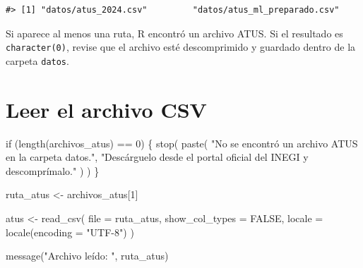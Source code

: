 \documentclass[
  spanish,
  10.5pt,
  letterpaper,
  openany,
  headings=big]{scrbook}
\newenvironment{Shaded}{}{}
\newcommand{\AttributeTok}[1]{\textcolor[rgb]{0.84,0.23,0.29}{#1}}
\newcommand{\ConstantTok}[1]{\textcolor[rgb]{0.00,0.36,0.77}{#1}}
\newcommand{\ControlFlowTok}[1]{\textcolor[rgb]{0.84,0.23,0.29}{#1}}
\newcommand{\DecValTok}[1]{\textcolor[rgb]{0.00,0.36,0.77}{#1}}
\newcommand{\FunctionTok}[1]{\textcolor[rgb]{0.44,0.26,0.76}{#1}}
\newcommand{\NormalTok}[1]{\textcolor[rgb]{0.14,0.16,0.18}{#1}}
\newcommand{\OtherTok}[1]{\textcolor[rgb]{0.44,0.26,0.76}{#1}}
\newcommand{\SpecialCharTok}[1]{\textcolor[rgb]{0.00,0.36,0.77}{#1}}
\newcommand{\StringTok}[1]{\textcolor[rgb]{0.01,0.18,0.38}{#1}}
\begin{document}
\begin{verbatim}
#> [1] "datos/atus_2024.csv"         "datos/atus_ml_preparado.csv"
\end{verbatim}

\begin{tcolorbox}[enhanced jigsaw, arc=.35mm, bottomrule=.15mm, bottomtitle=1mm, breakable, colback=white, colbacktitle=quarto-callout-tip-color!10!white, colframe=quarto-callout-tip-color-frame, coltitle=black, left=2mm, leftrule=.75mm, opacityback=0, opacitybacktitle=0.6, rightrule=.15mm, title=\textcolor{quarto-callout-tip-color}{\faLightbulb}\hspace{0.5em}{Interpretación}, titlerule=0mm, toprule=.15mm, toptitle=1mm]

Si aparece al menos una ruta, R encontró un archivo ATUS. Si el
resultado es \texttt{character(0)}, revise que el archivo esté
descomprimido y guardado dentro de la carpeta \texttt{datos}.

\end{tcolorbox}

\section{Leer el archivo CSV}\label{leer-el-archivo-csv}

\begin{Shaded}
\begin{Highlighting}[]
\ControlFlowTok{if}\NormalTok{ (}\FunctionTok{length}\NormalTok{(archivos\_atus) }\SpecialCharTok{==} \DecValTok{0}\NormalTok{) \{}
  \FunctionTok{stop}\NormalTok{(}
    \FunctionTok{paste}\NormalTok{(}
      \StringTok{"No se encontró un archivo ATUS en la carpeta datos."}\NormalTok{,}
      \StringTok{"Descárguelo desde el portal oficial del INEGI y descomprímalo."}
\NormalTok{    )}
\NormalTok{  )}
\NormalTok{\}}

\NormalTok{ruta\_atus }\OtherTok{\textless{}{-}}\NormalTok{ archivos\_atus[}\DecValTok{1}\NormalTok{]}

\NormalTok{atus }\OtherTok{\textless{}{-}} \FunctionTok{read\_csv}\NormalTok{(}
  \AttributeTok{file =}\NormalTok{ ruta\_atus,}
  \AttributeTok{show\_col\_types =} \ConstantTok{FALSE}\NormalTok{,}
  \AttributeTok{locale =} \FunctionTok{locale}\NormalTok{(}\AttributeTok{encoding =} \StringTok{"UTF{-}8"}\NormalTok{)}
\NormalTok{)}

\FunctionTok{message}\NormalTok{(}\StringTok{"Archivo leído: "}\NormalTok{, ruta\_atus)}
\end{Highlighting}
\end{Shaded}
\end{document}
